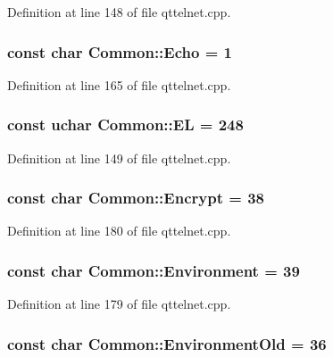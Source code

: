 Definition at line 148 of file qttelnet.cpp.

\hypertarget{namespaceCommon_aa937da7001f7db82c85470dea163ea00}{
\subsubsection[{Echo}]{\setlength{\rightskip}{0pt plus 5cm}const char {\bf Common::Echo} = 1}}
\label{namespaceCommon_aa937da7001f7db82c85470dea163ea00}


Definition at line 165 of file qttelnet.cpp.

\hypertarget{namespaceCommon_a483d993e9812ba125e32c9b6ea74d4bd}{
\subsubsection[{EL}]{\setlength{\rightskip}{0pt plus 5cm}const uchar {\bf Common::EL} = 248}}
\label{namespaceCommon_a483d993e9812ba125e32c9b6ea74d4bd}


Definition at line 149 of file qttelnet.cpp.

\hypertarget{namespaceCommon_ae4b07bea4fd099c7ca59ba365dbcd91a}{
\subsubsection[{Encrypt}]{\setlength{\rightskip}{0pt plus 5cm}const char {\bf Common::Encrypt} = 38}}
\label{namespaceCommon_ae4b07bea4fd099c7ca59ba365dbcd91a}


Definition at line 180 of file qttelnet.cpp.

\hypertarget{namespaceCommon_a9f157cc434d5d42310b92994f7d04bf7}{
\subsubsection[{Environment}]{\setlength{\rightskip}{0pt plus 5cm}const char {\bf Common::Environment} = 39}}
\label{namespaceCommon_a9f157cc434d5d42310b92994f7d04bf7}


Definition at line 179 of file qttelnet.cpp.

\hypertarget{namespaceCommon_a3dd92c3c9dd3d0240a864a64bb32f340}{
\subsubsection[{EnvironmentOld}]{\setlength{\rightskip}{0pt plus 5cm}const char {\bf Common::EnvironmentOld} = 36}}
\label{namespaceCommon_a3dd92c3c9dd3d0240a864a64bb32f340}


